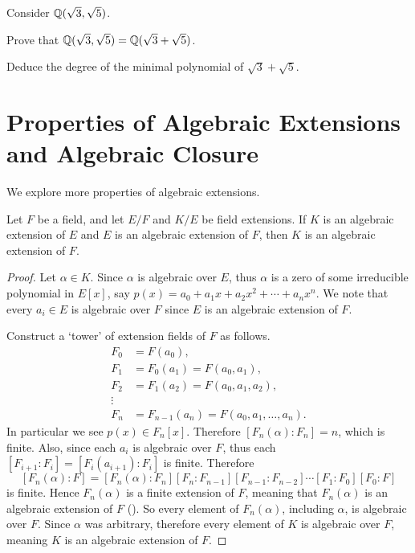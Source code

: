 \begin{exercise}\label{exercise-Q-sqrt3-sqrt5}
    Consider $\mathbb{Q}(\sqrt3,\sqrt5)$.
    \begin{partquestions}{\roman*}
        \item Prove that $\mathbb{Q}(\sqrt3,\sqrt5) = \mathbb{Q}(\sqrt3+\sqrt5)$.
        \item Deduce the degree of the minimal polynomial of $\sqrt3+\sqrt5$.
    \end{partquestions}
\end{exercise}

\section{Properties of Algebraic Extensions and Algebraic Closure}
We explore more properties of algebraic extensions.
\begin{theorem}\label{thrm-algebraic-over-algebraic-is-algebraic}
    Let $F$ be a field, and let $E/F$ and $K/E$ be field extensions. If $K$ is an algebraic extension of $E$ and $E$ is an algebraic extension of $F$, then $K$ is an algebraic extension of $F$.
\end{theorem}
\begin{proof}
    Let $\alpha \in K$. Since $\alpha$ is algebraic over $E$, thus $\alpha$ is a zero of some irreducible polynomial in $E[x]$, say $p(x) = a_0 + a_1x + a_2x^2 + \cdots + a_nx^n$. We note that every $a_i \in E$ is algebraic over $F$ since $E$ is an algebraic extension of $F$.

    Construct a `tower' of extension fields of $F$ as follows.
    \begin{align*}
        F_0 &= F(a_0),\\
        F_1 &= F_0(a_1) = F(a_0, a_1),\\
        F_2 &= F_1(a_2) = F(a_0, a_1, a_2),\\
        \vdots\\
        F_n &= F_{n-1}(a_n) = F(a_0, a_1, \dots, a_n).
    \end{align*}
    In particular we see $p(x) \in F_n[x]$. Therefore $[F_n(\alpha): F_n] = n$, which is finite. Also, since each $a_i$ is algebraic over $F$, thus each $[F_{i+1}:F_i] = [F_i(a_{i+1}):F_i]$ is finite. Therefore
    \[
        [F_n(\alpha):F] = [F_n(\alpha):F_n][F_n:F_{n-1}][F_{n-1}:F_{n-2}]\cdots[F_1:F_0][F_0:F]
    \]
    is finite. Hence $F_n(\alpha)$ is a finite extension of $F$, meaning that $F_n(\alpha)$ is an algebraic extension of $F$ (). So every element of $F_n(\alpha)$, including $\alpha$, is algebraic over $F$. Since $\alpha$ was arbitrary, therefore every element of $K$ is algebraic over $F$, meaning $K$ is an algebraic extension of $F$.
\end{proof}

